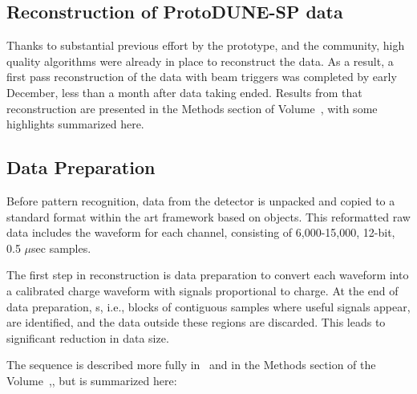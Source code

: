 \subsection{Reconstruction of ProtoDUNE-SP data}
Thanks to substantial previous effort by the  prototype,  and the   community, high quality algorithms were already in place to reconstruct the   data.  As a result, a first pass reconstruction of the  data with beam triggers was completed by early December, less than a month after data taking ended.  Results from that reconstruction are presented in the Methods section of Volume~\volnumberphysics,\voltitlephysics{} with some highlights summarized here. 



\subsection{Data Preparation}

Before pattern recognition, data from the  detector is
unpacked and copied to a standard format within the art framework based on  %
objects. 
This reformatted raw data includes the waveform for each channel, consisting of 6,000-15,000,  12-bit, 0.5 $\mu$sec samples. 

The first step in reconstruction is data preparation to
convert each  waveform into a calibrated charge waveform with
signals proportional to charge. At the end of data preparation, s, i.e., blocks of contiguous samples where
useful signals appear, are identified, and the data outside these regions are discarded.  This leads to significant reduction in data size. 



The sequence is described more fully in~\cite{bib:docdb12349} and in the Methods section of the Volume~\volnumberphysics,\voltitlephysics{}, but is summarized here: 

